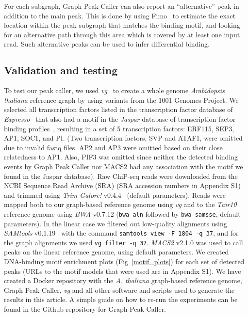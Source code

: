 \documentclass[10pt,letterpaper]{article}
\begin{document}
For each subgraph, Graph Peak Caller can also report an “alternative” peak in addition to the main peak.
This is done by using Fimo~\cite{fimo} to estimate the exact location within the peak subgraph that matches the binding motif, and looking for an alternative path through this area which is covered by at least one input read.
Such alternative peaks can be used to infer differential binding.

\subsection*{Validation and testing}
To test our peak caller, we used \emph{vg}~\cite{vg} to create a whole genome \emph{Arabidopsis thaliana} reference graph by using variants from the 1001 Genomes Project.
We selected all transcription factors listed in the transcription factor database of \emph{Expresso}~\cite{expresso} that also had a motif in the \emph{Jaspar} database of transcription factor binding profiles~\cite{jaspar}, resulting in a set of 5 transcription factors: ERF115, SEP3, AP1, SOC1, and PI.
(Two transcription factors, SVP and ATAF1, were omitted due to invalid fastq files. AP2 and AP3 were omitted based on their close relatedness to AP1. Also, PIF3 was omitted since neither the detected binding events by Graph Peak Caller nor MACS2 had any association with the motif we found in the Jaspar database).
Raw ChiP-seq reads were downloaded from the NCBI Sequence Read Archive (SRA) (SRA accession numbers in Appendix S1) and trimmed using \emph{Trim Galore!} v0.4.4~\cite{trim_galore} (default parameters).
Reads were mapped both to our graph-based reference genome using \emph{vg} and to the \emph{Tair10}~\cite{tair} reference genome using \emph{BWA} v0.7.12 (\texttt{bwa aln} followed by \texttt{bwa samsse}, default parameters).
In the linear case we filtered out low-quality alignments using \emph{SAMtools} v0.1.19~\cite{samtools} with the command \texttt{samtools view -F 1804 -q 37}, and for the graph alignments we used \texttt{vg filter -q 37}.
\emph{MACS2} v2.1.0 was used to call peaks on the linear reference genome, using default parameters. We created DNA-binding motif enrichment plots (Fig~\ref{motif_plots}) for each set of detected peaks (URLs to the motif models that were used are in Appendix S1). We have created a Docker repository with the \emph{A. thaliana} graph-based reference genome, Graph Peak Caller, \emph{vg} and all other software and scripts used to generate the results in this article. A simple guide on how to re-run the experiments can be found in the Github repository for Graph Peak Caller.
\end{document}
